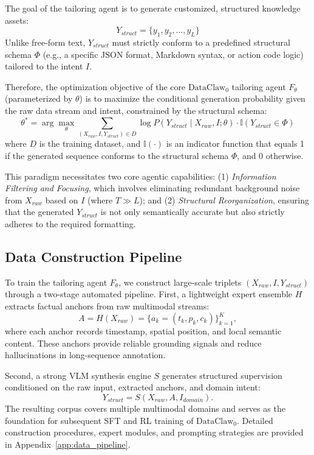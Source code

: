 The goal of the tailoring agent is to generate customized, structured knowledge assets:
\begin{equation}
Y_{struct} = \{y_1, y_2, \dots, y_L\}
\end{equation}
Unlike free-form text, \(Y_{struct}\) must strictly conform to a predefined structural schema \(\Phi\) (e.g., a specific JSON format, Markdown syntax, or action code logic) tailored to the intent \(I\).

Therefore, the optimization objective of the core $\text{DataClaw}_0$ tailoring agent \(F_\theta\) (parameterized by \(\theta\)) is to maximize the conditional generation probability given the raw data stream and intent, constrained by the structural schema:
\begin{equation}
\theta^* = \arg\max\limits_\theta \sum\limits_{(X_{raw},I,Y_{struct})\in D} \log P(Y_{struct}\mid X_{raw},I;\theta)\cdot \mathbb{I}(Y_{struct}\in\Phi)
\end{equation}
where \(D\) is the training dataset, and \(\mathbb{I}(\cdot)\) is an indicator function that equals 1 if the generated sequence conforms to the structural schema \(\Phi\), and 0 otherwise.

This paradigm necessitates two core agentic capabilities: (1) \textit{Information Filtering and Focusing}, which involves eliminating redundant background noise from \(X_{raw}\) based on \(I\) (where \(T \gg L\)); and (2) \textit{Structural Reorganization}, ensuring that the generated \(Y_{struct}\) is not only semantically accurate but also strictly adheres to the required formatting.

\subsection{Data Construction Pipeline}

To train the tailoring agent \(F_\theta\), we construct large-scale triplets \((X_{raw}, I, Y_{struct})\) through a two-stage automated pipeline. First, a lightweight expert ensemble \(H\) extracts factual anchors from raw multimodal streams:
\begin{equation}
A = H(X_{raw}) = \{a_k=(t_k,p_k,c_k)\}_{k=1}^{K},
\end{equation}
where each anchor records timestamp, spatial position, and local semantic content. These anchors provide reliable grounding signals and reduce hallucinations in long-sequence annotation.

Second, a strong VLM synthesis engine \(S\) generates structured supervision conditioned on the raw input, extracted anchors, and domain intent:
\begin{equation}
Y_{struct}=S(X_{raw}, A, I_{domain}).
\end{equation}
The resulting corpus covers multiple multimodal domains and serves as the foundation for subsequent SFT and RL training of $\text{DataClaw}_0$. Detailed construction procedures, expert modules, and prompting strategies are provided in Appendix~\ref{app:data_pipeline}.


